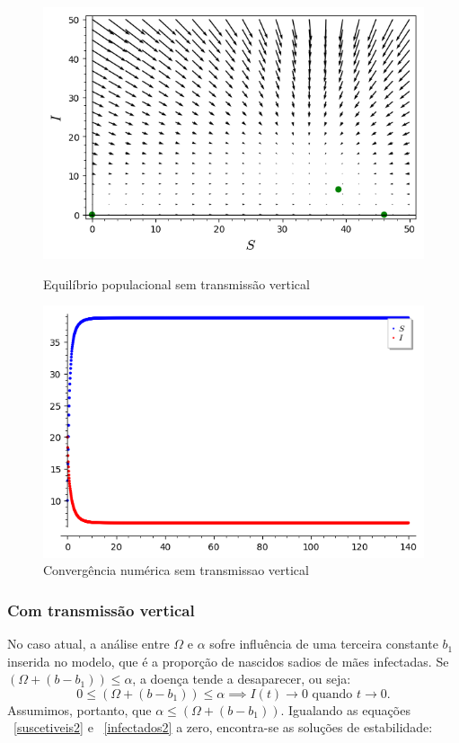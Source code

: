 \documentclass{article}
\begin{document}
\begin{figure}
    \centering
    \includegraphics[width=14cm]{imagens/plot1-biologia.PNG}
    \caption{Equilíbrio populacional sem transmissão vertical}
    \includegraphics[width=14cm]{imagens/curvasemtransmissaovertical.png}
    \caption{Convergência numérica sem transmissao vertical}
    \label{fig:my_label}
\end{figure}

\subsubsection{Com transmissão vertical}
No caso atual, a análise entre $\Omega$ e $\alpha$ sofre influência de uma terceira constante $b_1$ inserida no modelo, que é a proporção de nascidos sadios de mães infectadas. Se  $ (\Omega +(b- b_1)) \leq \alpha $, a doença tende a desaparecer, ou seja:
$$ 0 \leq (\Omega +(b- b_1)) \leq \alpha \implies I(t)\rightarrow 0 \mbox{ quando } t\rightarrow 0.$$
Assumimos, portanto, que $ \alpha \leq (\Omega +(b- b_1))  $. Igualando as equações ~\ref{suscetiveis2} e ~\ref{infectados2} a zero, encontra-se as soluções de estabilidade:
\end{document}
